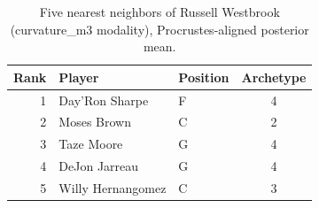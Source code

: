 \begin{table}[htbp]
  \centering\small
  \begin{tabular}{rllc}
    \toprule
    Rank & Player & Position & Archetype \\
    \midrule
    1 & Day'Ron Sharpe & F & 4 \\
    2 & Moses Brown & C & 2 \\
    3 & Taze Moore & G & 4 \\
    4 & DeJon Jarreau & G & 4 \\
    5 & Willy Hernangomez & C & 3 \\
    \bottomrule
  \end{tabular}
  \caption{Five nearest neighbors of Russell Westbrook (curvature_m3 modality), Procrustes-aligned posterior mean.}
  \label{tab:Russell_Westbrook_neighbors_curvature_m3}
\end{table}

